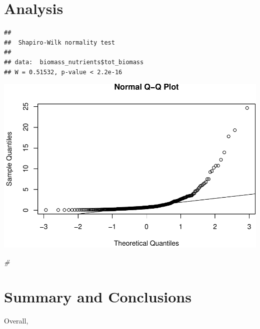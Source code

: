 \documentclass[12pt,]{article}
\newenvironment{Shaded}{\begin{snugshade}}{\end{snugshade}}
\newcommand{\KeywordTok}[1]{\textcolor[rgb]{0.13,0.29,0.53}{\textbf{#1}}}
\newcommand{\CommentTok}[1]{\textcolor[rgb]{0.56,0.35,0.01}{\textit{#1}}}
\newcommand{\OperatorTok}[1]{\textcolor[rgb]{0.81,0.36,0.00}{\textbf{#1}}}
\newcommand{\NormalTok}[1]{#1}
\begin{document}
\section{Analysis}\label{analysis}

\begin{Shaded}
\end{Shaded}

\begin{verbatim}
## 
##  Shapiro-Wilk normality test
## 
## data:  biomass_nutrients$tot_biomass
## W = 0.51532, p-value < 2.2e-16
\end{verbatim}

\begin{Shaded}
\end{Shaded}

\includegraphics{Chen_ENV872_Project_files/figure-latex/Analysis-1.pdf}

\begin{Shaded}
\begin{Highlighting}[]
\CommentTok{#}
\end{Highlighting}
\end{Shaded}

\newpage

\section{Summary and Conclusions}\label{summary-and-conclusions}

Overall,
\end{document}
